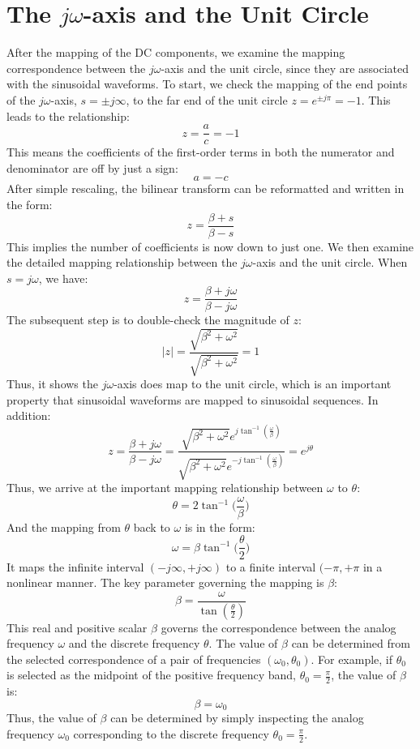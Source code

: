 \documentclass{article}
\begin{document}
\section{The \(j\omega\)-axis and the Unit Circle}
After the mapping of the DC components, we examine the mapping correspondence between the \(j\omega\)-axis and the unit circle, since they are associated with the sinusoidal waveforms. To start, we check the mapping of the end points of the \(j\omega\)-axis, \(s=\pm j\infty\), to the far end of the unit circle \(z=e^{\pm j\pi}=-1\). This leads to the relationship:
\[
z=\frac{a}{c}=-1
\]
This means the coefficients of the first-order terms in both the numerator and denominator are off by just a sign:
\[
a=-c
\]
After simple rescaling, the bilinear transform can be reformatted and written in the form:
\[
z=\frac{\beta+s}{\beta-s}
\]
This implies the number of coefficients is now down to just one. We then examine the detailed mapping relationship between the \(j\omega\)-axis and the unit circle. When \(s=j\omega\), we have:
\[
z=\frac{\beta+j\omega}{\beta-j\omega}
\]
The subsequent step is to double-check the magnitude of \(z\):
\[
|z|=\frac{\sqrt{\beta^2+\omega^2}}{\sqrt{\beta^2+\omega^2}}=1
\]
Thus, it shows the \(j\omega\)-axis does map to the unit circle, which is an important property that sinusoidal waveforms are mapped to sinusoidal sequences. In addition:
\[
z=\frac{\beta+j\omega}{\beta-j\omega}=\frac{\sqrt{\beta^2+\omega^2}e^{j\tan^{-1}(\frac{\omega}{\beta})}}{\sqrt{\beta^2+\omega^2}e^{-j\tan^{-1}(\frac{\omega}{\beta})}}=e^{j\theta}
\]
Thus, we arrive at the important mapping relationship between \(\omega\) to \(\theta\):
\[
\theta=2\tan^{-1}\bigg(\frac{\omega}{\beta}\bigg)
\]
And the mapping from \(\theta\) back to \(\omega\) is in the form:
\[
\omega=\beta\tan^{-1}\bigg(\frac{\theta}{2}\bigg)
\]
It maps the infinite interval \((-j\infty,+j\infty)\) to a finite interval \((-\pi,+\pi\) in a nonlinear manner. The key parameter governing the mapping is \(\beta\):
\[
\beta=\frac{\omega}{\tan(\frac{\theta}{2})}
\]
This real and positive scalar \(\beta\) governs the correspondence between the analog frequency \(\omega\) and the discrete frequency \(\theta\). The value of \(\beta\) can be determined from the selected correspondence of a pair of frequencies \((\omega_0,\theta_0)\). For example, if \(\theta_0\) is selected as the midpoint of the positive frequency band, \(\theta_0=\frac{\pi}{2}\), the value of \(\beta\) is:
\[
\beta=\omega_0
\]
Thus, the value of \(\beta\) can be determined by simply inspecting the analog frequency \(\omega_0\) corresponding to the discrete frequency \(\theta_0=\frac{\pi}{2}\).
\end{document}
